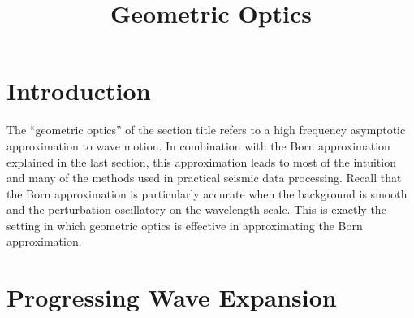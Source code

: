 \title{Geometric Optics}
\maketitle

\label{ch:ray}


\section{Introduction}
The ``geometric optics'' of the section title refers to a high frequency asymptotic approximation to wave motion. In combination with the Born approximation explained in the last section, this approximation leads to most of the intuition and many of the methods used in practical seismic data processing. Recall that the Born approximation is particularly accurate when the background is smooth and the perturbation oscillatory on the wavelength scale. This is exactly the setting in which geometric optics is effective in approximating the Born approximation.

\section{Progressing Wave Expansion}

